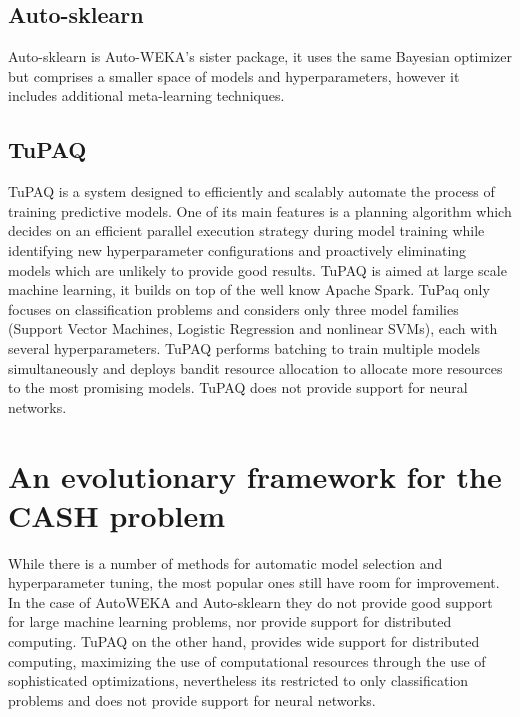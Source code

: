 \documentclass{article}
\begin{document}
\subsection{Auto-sklearn}

Auto-sklearn \cite{Feurer2015} is Auto-WEKA's sister package, it uses the same Bayesian optimizer but comprises a smaller space of models and hyperparameters, however it includes additional meta-learning techniques.

\subsection{TuPAQ}

TuPAQ \cite{sparks2015} is a system designed to efficiently and scalably automate the process of training predictive models. One of its main features is a planning algorithm which decides on an efficient parallel execution strategy during model training while identifying new hyperparameter configurations and proactively eliminating models which are unlikely to provide good results. TuPAQ is aimed at large scale machine learning, it builds on top of the well know Apache Spark. TuPaq only focuses on classification problems and considers only three model families (Support Vector Machines, Logistic Regression and nonlinear SVMs), each with several hyperparameters. TuPAQ performs batching to train multiple models simultaneously and deploys bandit resource allocation to allocate more resources to the most promising models. TuPAQ does not provide support for neural networks.


\section{An evolutionary framework for the CASH problem }
\label{sec:proposal}

While there is a number of methods for automatic model selection and hyperparameter tuning, the most popular ones still have room for improvement. In the case of AutoWEKA and Auto-sklearn they do not provide good support for large machine learning problems, nor provide support for distributed computing. TuPAQ on the other hand, provides wide support for distributed computing, maximizing the use of computational resources through the use of sophisticated optimizations, nevertheless its restricted to only classification problems and does not provide support for neural networks.
\end{document}

